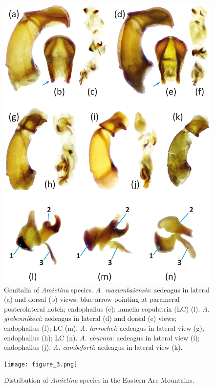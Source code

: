 \documentclass[fleqn,10pt,lineno]{wlpeerj}
\begin{document}
\begin{figure}[ht]
\centering
\includegraphics[width=\linewidth]{figure_2.jpg}
\caption{Genitalia of \textit{Amietina} species. \textit{A. mazumbaiensis}: aedeagus in lateral (a) and dorsal (b) views, blue arrow pointing at parameral posterolateral notch; endophallus (c); lamella copulatrix (LC) (l). \textit{A. grebennikovi}: aedeagus in lateral (d) and dorsal (e) views; endophallus (f); LC (m). \textit{A. larrochei}: aedeagus in lateral view (g); endophallus (h); LC (n). \textit{A. eburnea}: aedeagus in lateral view (i); endophallus (j). \textit{A. cambeforti}: aedeagus in lateral view (k).}
\label{fig:fig2}
\end{figure}

\begin{figure}[ht]
\centering
\texttt{[image: figure\_3.png]}
\caption{Distribution of \textit{Amietina} species in the Eastern Arc Mountains.}
\label{fig:fig3}
\end{figure}


\end{document}
